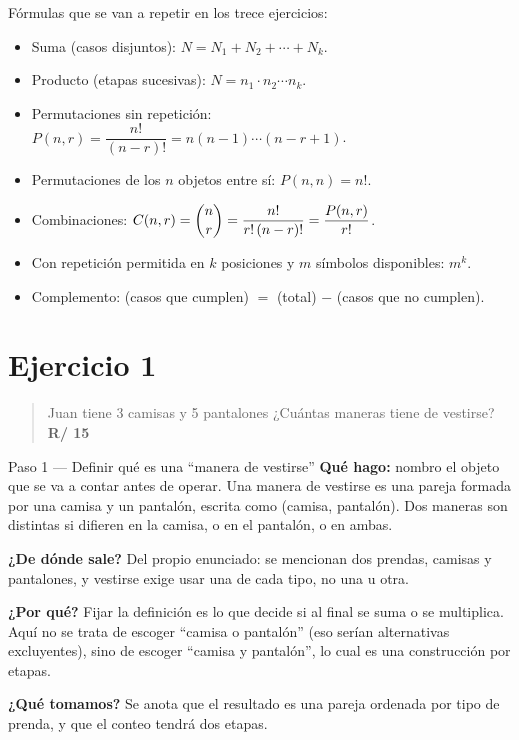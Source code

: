 \documentclass[11pt]{article}
\begin{document}
\begin{tip}
Fórmulas que se van a repetir en los trece ejercicios:
\begin{itemize}[leftmargin=*]
  \item Suma (casos disjuntos): $N=N_1+N_2+\cdots+N_k$.
  \item Producto (etapas sucesivas): $N=n_1\cdot n_2\cdots n_k$.
  \item Permutaciones sin repetición: $P(n,r)=\dfrac{n!}{(n-r)!}=n(n-1)\cdots(n-r+1)$.
  \item Permutaciones de los $n$ objetos entre sí: $P(n,n)=n!$.
  \item Combinaciones: $C(n,r)=\dbinom{n}{r}=\dfrac{n!}{r!\,(n-r)!}=\dfrac{P(n,r)}{r!}$.
  \item Con repetición permitida en $k$ posiciones y $m$ símbolos disponibles: $m^k$.
  \item Complemento: (casos que cumplen) $=$ (total) $-$ (casos que no cumplen).
\end{itemize}
\end{tip}

\section*{Ejercicio 1}

\begin{quote}
Juan tiene 3 camisas y 5 pantalones ¿Cuántas maneras tiene de vestirse?\\[2pt]
\textbf{R/ 15}
\end{quote}

\begin{paso}{Paso 1 --- Definir qué es una ``manera de vestirse''}
\textbf{Qué hago:} nombro el objeto que se va a contar antes de operar. Una manera de vestirse es una pareja formada por una camisa y un pantalón, escrita como (camisa, pantalón). Dos maneras son distintas si difieren en la camisa, o en el pantalón, o en ambas.

\textbf{¿De dónde sale?} Del propio enunciado: se mencionan dos prendas, camisas y pantalones, y vestirse exige usar una de cada tipo, no una u otra.

\textbf{¿Por qué?} Fijar la definición es lo que decide si al final se suma o se multiplica. Aquí no se trata de escoger ``camisa o pantalón'' (eso serían alternativas excluyentes), sino de escoger ``camisa y pantalón'', lo cual es una construcción por etapas.

\textbf{¿Qué tomamos?} Se anota que el resultado es una pareja ordenada por tipo de prenda, y que el conteo tendrá dos etapas.
\end{paso}
\end{document}
